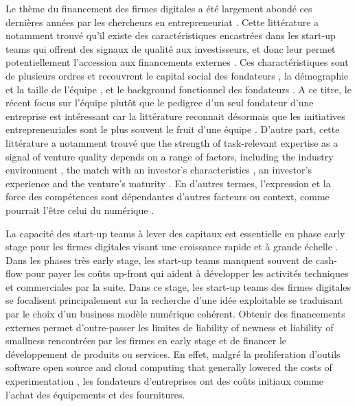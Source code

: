 \documentclass[12pt]{article}
\begin{document}
Le thème du financement des firmes digitales a été largement abondé ces dernières années par les chercheurs en entrepreneuriat \citep{klein2020start}. Cette littérature a notamment trouvé qu'il existe des caractéristiques encastrées dans les start-up teams qui offrent des signaux de qualité aux investisseurs, et donc leur permet potentiellement l'accession aux financements externes \citep{pinelli2020too, reese2020should}. Ces charactéristiques sont de plusieurs ordres et recouvrent le capital social des fondateurs \citep{shane2002network}, la démographie et la taille de l'équipe \citep{eisenhardt1990organizational}, et le background fonctionnel des fondateurs \citep{ensley1998effect}. A ce titre, le récent focus sur l'équipe plutôt que le pedigree d'un seul fondateur d'une entreprise est intéressant car la littérature reconnait désormais que les initiatives entrepreneuriales sont le plus souvent le fruit d'une équipe \citep{klotz2014new}. D'autre part, cette littérature a notamment trouvé que the strength of task-relevant expertise as a signal of venture quality depends on a range of factors, including the industry environment \citep{townsend2015turning}, the match with an investor’s characteristics \citep{aggarwal2015evaluating}, an investor’s experience \citep{franke2008venture} and the venture’s maturity \citep{hallen2008causes}. En d'autres termes, l'expression et la force des compétences sont dépendantes d'autres facteurs ou context, comme pourrait l'être celui du numérique \citep{nambisan2017digital}.

La capacité des start-up teams à lever des capitaux est essentielle en phase early stage pour les firmes digitales visant une croissance rapide et à grande échelle \citep{rosenbusch2013does}. Dans les phases très early stage, les start-up teams manquent souvent de cash-flow pour payer les coûts up-front qui aident à développer les activités techniques et commerciales par la suite. Dans ce stage, les start-up teams des firmes digitales se focalisent principalement sur la recherche d'une idée exploitable se traduisant par le choix d'un business modèle numérique cohérent. Obtenir des financements externes permet d'outre-passer les limites de liability of newness et liability of smallness rencontrées par les firmes en early stage et de financer le développement de produits ou services. En effet, malgré la proliferation d'outils software open source and cloud computing that generally lowered the costs of experimentation \citep{nanda2016financing}, les fondateurs d'entreprises ont des coûts initiaux comme l'achat des équipements et des fournitures.
\end{document}

